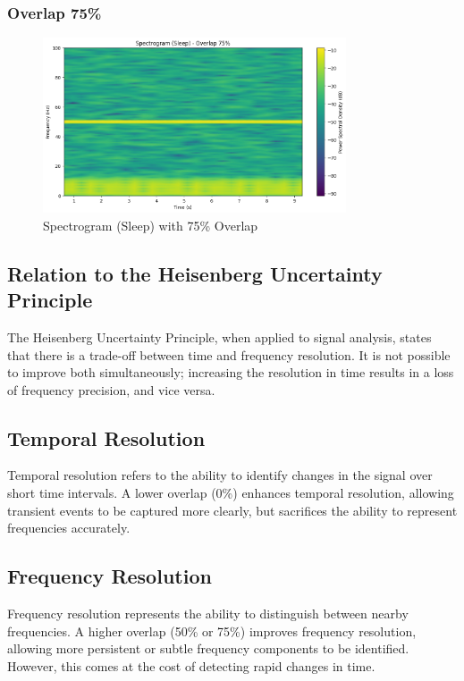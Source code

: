 \documentclass[10pt]{article}
\theoremstyle{definition}
\theoremstyle{remark}
\theoremstyle{definition}
\numberwithin{equation}{prob}
\begin{document}
\subsubsection{Overlap 75\%}

\begin{figure}[H]
    \centering
    \includegraphics[width=0.8\textwidth]{./figures/Spectrogram Sleep Overlap 75.png}
    \caption{Spectrogram (Sleep) with 75\% Overlap}
    \label{fig:sleep_75_overlap}
\end{figure}

\subsection{Relation to the Heisenberg Uncertainty Principle}

The Heisenberg Uncertainty Principle, when applied to signal analysis, states that there is a trade-off between time and frequency resolution. It is not possible to improve both simultaneously; increasing the resolution in time results in a loss of frequency precision, and vice versa.

\subsection*{Temporal Resolution}
Temporal resolution refers to the ability to identify changes in the signal over short time intervals. A lower overlap (0\%) enhances temporal resolution, allowing transient events to be captured more clearly, but sacrifices the ability to represent frequencies accurately.

\subsection*{Frequency Resolution}
Frequency resolution represents the ability to distinguish between nearby frequencies. A higher overlap (50\% or 75\%) improves frequency resolution, allowing more persistent or subtle frequency components to be identified. However, this comes at the cost of detecting rapid changes in time.
\end{document}
